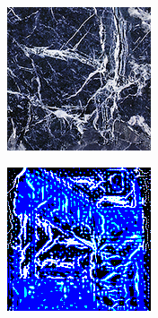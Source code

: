 \begin{figure}[]
\begin{subfigure}{\textwidth}
        \begin{subfigure}{0.19\textwidth}
            \centering
            \includegraphics[width=\textwidth]{images/04-experiment03/staircase_marble_target.jpg}
            \caption*{}
        \end{subfigure}
        \hfill
        \begin{subfigure}{0.19\textwidth}
            \centering
            \includegraphics[width=\textwidth]{images/04-experiment03/staircase_illum/marble/stats_im.jpg}

\end{subfigure}
\end{subfigure}
\end{figure}
